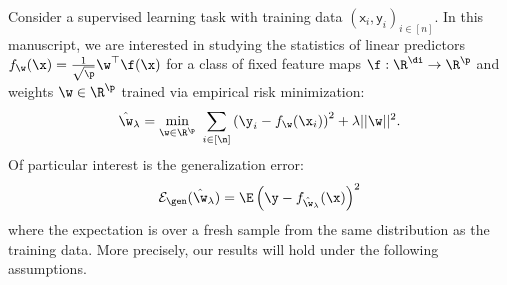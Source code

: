 Consider a supervised learning task with training data $(\mathsf x_{i},\mathsf y_{i})_{i\in[n]}$. In this manuscript, we are interested in studying the statistics of linear predictors $f_{\w}(\x)	= \frac{1}{\sqrt{\p}}\w^{\top}\f(\x)$ for a class of fixed feature maps $\f:\R^{\di}\to\R^{\p}$ and weights $\w\in\R^{\p}$ trained via empirical risk minimization:
\begin{align}
    \label{eq:def:erm}
    \hat{\w}_{\lambda} = \underset{\w\in\R^{\p}}{\min}~\sum\limits_{i\in[\n]}\left(\y_{i}-f_{\w}(\x_{i})\right)^{2} + \lambda||\w||^{2}.
\end{align}
Of particular interest is the generalization error:
\begin{align}\label{eq:gen err def}
    \mathcal{E}_{\gen}(\hat{\w}_{\lambda}) = \E\left(\y - f_{\hat{\w}_{\lambda}}(\x)\right)^{2}
\end{align}
where the expectation is over a fresh sample from the same distribution as the training data. More precisely, our results will hold under the following assumptions.

